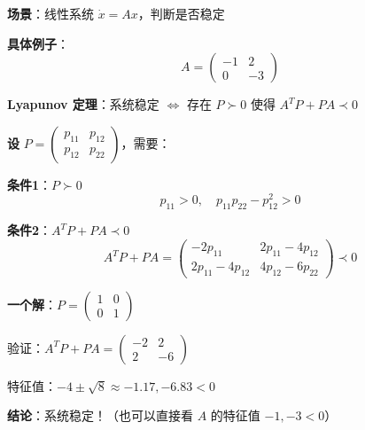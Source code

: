 \documentclass[12pt, a4paper]{ctexart}
\begin{document}
\begin{blackboard}

\textbf{场景}：线性系统 $\dot{x} = Ax$，判断是否稳定

\textbf{具体例子}：
\[
A = \begin{pmatrix} -1 & 2 \\ 0 & -3 \end{pmatrix}
\]

\textbf{Lyapunov 定理}：系统稳定 $\Leftrightarrow$ 存在 $P \succ 0$ 使得 $A^T P + P A \prec 0$

\textbf{设} $P = \begin{pmatrix} p_{11} & p_{12} \\ p_{12} & p_{22} \end{pmatrix}$，需要：

\textbf{条件1}：$P \succ 0$
\[
p_{11} > 0, \quad p_{11} p_{22} - p_{12}^2 > 0
\]

\textbf{条件2}：$A^T P + P A \prec 0$
\[
A^T P + P A = \begin{pmatrix} -2p_{11} & 2p_{11} - 4p_{12} \\ 2p_{11} - 4p_{12} & 4p_{12} - 6p_{22} \end{pmatrix} \prec 0
\]

\textbf{一个解}：$P = \begin{pmatrix} 1 & 0 \\ 0 & 1 \end{pmatrix}$

验证：$A^T P + P A = \begin{pmatrix} -2 & 2 \\ 2 & -6 \end{pmatrix}$

特征值：$-4 \pm \sqrt{8} \approx -1.17, -6.83 < 0$ \checkmark

\textbf{结论}：系统稳定！（也可以直接看 $A$ 的特征值 $-1, -3 < 0$）

\end{blackboard}
\end{document}
